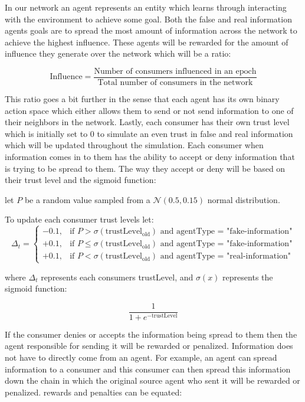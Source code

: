 \documentclass[twoside]{article}
\begin{document}
In our network an agent represents an entity which learns through interacting with the environment to achieve some goal. Both the false and real information agents goals are to spread the most amount of information across the network to achieve the highest influence. These agents will be rewarded for the amount of influence they generate over the network which will be a ratio:

\[
\text{Influence} = \frac{\text{Number of consumers influenced in an epoch}}{\text{Total number of consumers in the network}}
\]

This ratio goes a bit further in the sense that each agent has its own binary action space which either allows them to send or not send information to one of their neighbors in the network. Lastly, each consumer has their own trust level which is initially set to 0 to simulate an even trust in false and real information which will be updated throughout the simulation. Each consumer when information comes in to them has the ability to accept or deny information that is trying to be spread to them. The way they accept or deny will be based on their trust level and the sigmoid function:

let $P$ be a random value sampled from a $\mathcal{N}(0.5, 0.15)$ normal distribution.

To update each consumer trust levels let:
\[
\Delta_{t} = 
\begin{cases} 
-0.1, & \text{if } P > \sigma(\text{trustLevel}_{\text{old}}) \text{ and agentType = "fake-information"} \\
+0.1, & \text{if } P \leq \sigma(\text{trustLevel}_{\text{old}}) \text{ and agentType = "fake-information"}\\
+0.1, & \text{if } P < \sigma(\text{trustLevel}_{\text{old}}) \text{ and agentType = "real-information"}
\end{cases}
\]

where $\Delta_{t}$ represents each consumers trustLevel, and $\sigma(x)$ represents the sigmoid function:

\[
\frac{1}{1 + e^{-\text{trustLevel}}}
\]

If the consumer denies or accepts the information being spread to them then the agent responsible for sending it will be rewarded or penalized. Information does not have to directly come from an agent. For example, an agent can spread information to a consumer and this consumer can then spread this information down the chain in which the original source agent who sent it will be rewarded or penalized. rewards and penalties can be equated:
\end{document}
